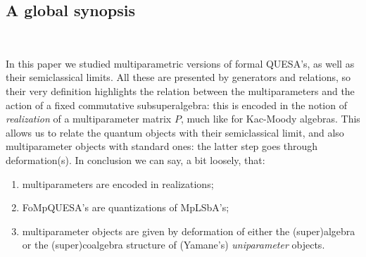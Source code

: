 \documentclass[12pt,reqno,twoside,a4paper]{amsart}
\numberwithin{equation}{section}
\theoremstyle{definition}
\newtheorem{free text}[lema]{}
\theoremstyle{remark}
\theoremstyle{plain}
\begin{document}
\subsection{A global synopsis}  \label{subsec: global synopsis} \

\medskip

%
 In this paper we studied multiparametric versions of formal QUESA's,
 as well as their semiclassical limits.  All these are presented by generators and relations,
 so their very definition highlights the relation between
 the multiparameters and the action of a fixed commutative subsuperalgebra:
 this is encoded in the notion of  \textsl{realization\/}
 of a multiparameter matrix  $ P $,  much like for Kac-Moody algebras.
 This allows us to relate the quantum objects with their semiclassical limit,
 and also multiparameter objects with standard ones:
 the latter step goes through deformation(s).
%
 \vskip5pt
%
   In conclusion we can say, a bit loosely, that:
%
 \vskip2pt
%
\begin{enumerate}
  \item[$(a)$]  multiparameters are encoded in realizations;
%
 \vskip2pt
%
  \item[$(b)$]  FoMpQUESA's are quantizations of MpLSbA's;
%
 \vskip2pt
%
  \item[$(c)$]  multiparameter objects are given by deformation of
  either the (super)algebra or the (super)coalgebra structure of (Yamane's)  \textsl{uniparameter\/}  objects.
%
\end{enumerate}

\vskip5pt
\end{document}
